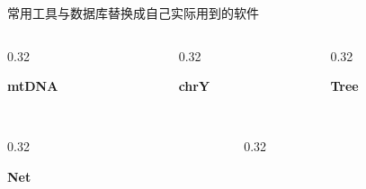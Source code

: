 \documentclass[aspectratio=169]{ctexbeamer}
\begin{document}
\begin{frame}[shrink=6]{常用工具与数据库}{替换成自己实际用到的软件}
  \vspace{0.5mm}

  \begin{columns}[t]
    \begin{column}{0.32\textwidth}
      \begin{card}
        \centering
        {\color{pinkL}\bfseries mtDNA}\\[1mm]
        \\[0.8mm]
      \end{card}
    \end{column}
    \begin{column}{0.32\textwidth}
      \begin{card}
        \centering
        {\color{blueL}\bfseries chrY}\\[1mm]
        \\[0.8mm]
      \end{card}
    \end{column}
    \begin{column}{0.32\textwidth}
      \begin{card}
        \centering
        {\color{goldL}\bfseries Tree}\\[1mm]
        \\[0.8mm]
      \end{card}
    \end{column}
  \end{columns}
  \begin{columns}[t]
    \begin{column}{0.32\textwidth}
      \begin{card}
        \centering
        {\color{violetL}\bfseries Net}\\[1mm]
        \\[0.8mm]
      \end{card}
    \end{column}
    \begin{column}{0.32\textwidth}

\end{column}
\end{columns}
\end{frame}
\end{document}
